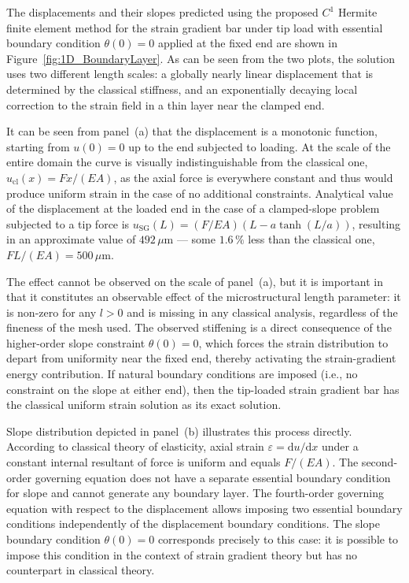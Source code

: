 \documentclass[final,3p,times,fleqn]{elsarticle}
\begin{document}
The displacements and their slopes predicted using the proposed
$C^{1}$ Hermite finite element method for the strain gradient bar under
tip load with essential boundary condition $\theta(0)=0$ applied at the
fixed end are shown in Figure~\ref{fig:1D_BoundaryLayer}.
As can be seen from the two plots, the solution uses two different
length scales: a globally nearly linear displacement that is determined
by the classical stiffness, and an exponentially decaying local
correction to the strain field in a thin layer near the clamped end.


It can be seen from panel~(a) that the displacement is a monotonic function,
starting from $u(0) = 0$ up to the end subjected to loading.
At the scale of the entire domain the curve is visually indistinguishable from the classical one,
$u_{\mathrm{cl}}(x) = Fx/(EA)$, as the axial force is everywhere constant and thus would produce
uniform strain in the case of no additional constraints.
Analytical value of the displacement at the loaded end in the case of a clamped-slope problem
subjected to a tip force is $u_{\mathrm{SG}}(L) = (F/EA)(L - a\tanh(L/a))$, resulting
in an approximate value of $492\,\mu\mathrm{m}$ --- some $1.6\,\%$ less than the classical
one, $FL/(EA) = 500\,\mu\mathrm{m}$.

The effect cannot be observed on the scale of panel~(a),
but it is important in that it constitutes an observable effect of the
microstructural length parameter: it is non-zero for any $l > 0$ and
is missing in any classical analysis, regardless of the fineness of the mesh used.
The observed stiffening is a direct consequence of the higher-order slope constraint $\theta(0)=0$, which forces the strain distribution to depart from uniformity near the fixed end, thereby activating the strain-gradient energy contribution. If natural boundary conditions are imposed (i.e., no constraint on
the slope at either end), then the tip-loaded strain gradient bar
has the classical uniform strain solution as its exact solution.


Slope distribution depicted in panel~(b) illustrates this process
directly.
According to classical theory of elasticity, axial strain
$\varepsilon = \mathrm{d}u/\mathrm{d}x$ under a constant internal
resultant of force is uniform and equals $F/(EA)$. The second-order
governing equation does not have a separate essential boundary
condition for slope and cannot generate any boundary layer.
The fourth-order governing equation with respect to the displacement
allows imposing two essential boundary conditions independently of
the displacement boundary conditions.
The slope boundary condition $\theta(0)=0$ corresponds precisely to
this case: it is possible to impose this condition in the context of
strain gradient theory but has no counterpart in classical theory.
\end{document}
